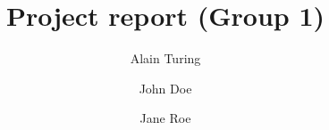 \title{Project report (Group 1)} %
\author{Alain Turing \and John Doe \and Jane Roe} %

\institute{\lectureInstitute} %
\begin{report}









\end{report}

